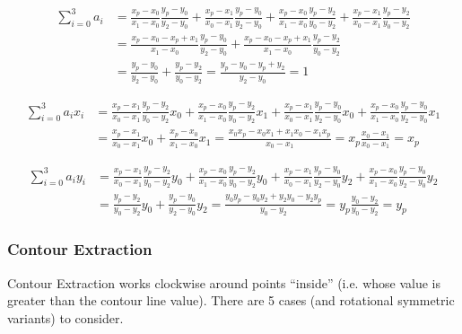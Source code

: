 \documentclass[a4paper,10pt,pdftex]{article}
\begin{document}
\begin{equation}
  \begin{split}
    \sum_{i=0}^{3}a_i &= \frac{x_p-x_0}{x_1-x_0}\frac{y_p-y_0}{y_2-y_0}+
    \frac{x_p-x_1}{x_0-x_1}\frac{y_p-y_0}{y_2-y_0} +
    \frac{x_p-x_0}{x_1-x_0}\frac{y_p-y_2}{y_0-y_2} +
    \frac{x_p-x_1}{x_0-x_1}\frac{y_p-y_2}{y_0-y_2} \\
    &= \frac{x_p-x_0-x_p+x_1}{x_1-x_0}\frac{y_p-y_0}{y_2-y_0}+
    \frac{x_p-x_0-x_p+x_1}{x_1-x_0}\frac{y_p-y_2}{y_0-y_2} \\
    &= \frac{y_p-y_0}{y_2-y_0}+\frac{y_p-y_2}{y_0-y_2}
    = \frac{y_p-y_0-y_p+y_2}{y_2-y_0} = 1
  \end{split}
\end{equation}

\begin{equation}
  \begin{split}
    \sum_{i=0}^{3}a_ix_i &= \frac{x_p-x_1}{x_0-x_1}\frac{y_p-y_2}{y_0-y_2}x_0+
    \frac{x_p-x_0}{x_1-x_0}\frac{y_p-y_2}{y_0-y_2}x_1+
    \frac{x_p-x_1}{x_0-x_1}\frac{y_p-y_0}{y_2-y_0}x_0+
    \frac{x_p-x_0}{x_1-x_0}\frac{y_p-y_0}{y_2-y_0}x_1 \\
    &= \frac{x_p-x_1}{x_0-x_1}x_0+\frac{x_p-x_0}{x_1-x_0}x_1
    = \frac{x_0x_p-x_0x_1+x_1x_0-x_1x_p}{x_0-x_1}
    = x_p\frac{x_0-x_1}{x_0-x_1} = x_p
  \end{split}
\end{equation}

\begin{equation}
  \begin{split}
    \sum_{i=0}^{3}a_iy_i &= \frac{x_p-x_1}{x_0-x_1}\frac{y_p-y_2}{y_0-y_2}y_0+
    \frac{x_p-x_0}{x_1-x_0}\frac{y_p-y_2}{y_0-y_2}y_0 +
    \frac{x_p-x_1}{x_0-x_1}\frac{y_p-y_0}{y_2-y_0}y_2 +
    \frac{x_p-x_0}{x_1-x_0}\frac{y_p-y_0}{y_2-y_0}y_2 \\
    &= \frac{y_p-y_2}{y_0-y_2}y_0+\frac{y_p-y_0}{y_2-y_0}y_2
    = \frac{y_0y_p-y_0y_2+y_2y_0-y_2y_p}{y_0-y_2}
    = y_p\frac{y_0-y_2}{y_0-y_2} = y_p
  \end{split}
\end{equation}

\subsubsection{Contour Extraction}

Contour Extraction works clockwise around points ``inside'' (i.e. whose value is greater than the contour line value). There are 5 cases (and rotational symmetric variants) to consider.
\end{document}
